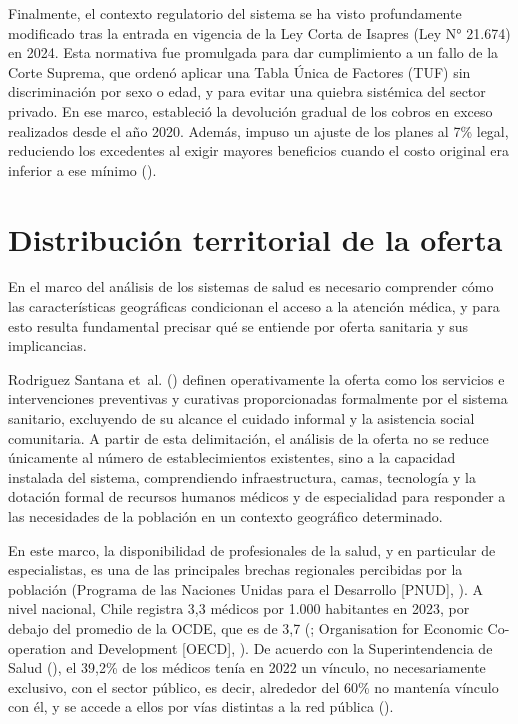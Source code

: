 \documentclass[
  spanish,
  a4paper,
  oneside]{scrbook}
\begin{document}
Finalmente, el contexto regulatorio del sistema se ha visto
profundamente modificado tras la entrada en vigencia de la Ley Corta de
Isapres (Ley N° 21.674) en 2024. Esta normativa fue promulgada para dar
cumplimiento a un fallo de la Corte Suprema, que ordenó aplicar una
Tabla Única de Factores (TUF) sin discriminación por sexo o edad, y para
evitar una quiebra sistémica del sector privado. En ese marco,
estableció la devolución gradual de los cobros en exceso realizados
desde el año 2020. Además, impuso un ajuste de los planes al 7\% legal,
reduciendo los excedentes al exigir mayores beneficios cuando el costo
original era inferior a ese mínimo
().

\section{Distribución territorial de la
oferta}\label{distribuciuxf3n-territorial-de-la-oferta}

En el marco del análisis de los sistemas de salud es necesario
comprender cómo las características geográficas condicionan el acceso a
la atención médica, y para esto resulta fundamental precisar qué se
entiende por oferta sanitaria y sus implicancias.

Rodriguez Santana et~al.
() definen operativamente
la oferta como los servicios e intervenciones preventivas y curativas
proporcionadas formalmente por el sistema sanitario, excluyendo de su
alcance el cuidado informal y la asistencia social comunitaria. A partir
de esta delimitación, el análisis de la oferta no se reduce únicamente
al número de establecimientos existentes, sino a la capacidad instalada
del sistema, comprendiendo infraestructura, camas, tecnología y la
dotación formal de recursos humanos médicos y de especialidad para
responder a las necesidades de la población en un contexto geográfico
determinado.

En este marco, la disponibilidad de profesionales de la salud, y en
particular de especialistas, es una de las principales brechas
regionales percibidas por la población (Programa de las Naciones Unidas
para el Desarrollo {[}PNUD{]},
). A nivel nacional, Chile
registra 3,3 médicos por 1.000 habitantes en 2023, por debajo del
promedio de la OCDE, que es de 3,7
(;
Organisation for Economic Co-operation and Development {[}OECD{]},
). De acuerdo con la
Superintendencia de Salud
(), el 39,2\%
de los médicos tenía en 2022 un vínculo, no necesariamente exclusivo,
con el sector público, es decir, alrededor del 60\% no mantenía vínculo
con él, y se accede a ellos por vías distintas a la red pública
().
\end{document}
